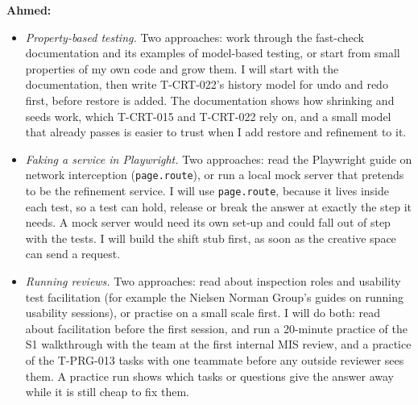 \documentclass[12pt, titlepage]{article}
\begin{document}
\begin{enumerate}
\textbf{Ahmed:}
\begin{itemize}
\item \emph{Property-based testing.} Two approaches: work through the
fast-check documentation and its examples of model-based testing, or start
from small properties of my own code and grow them. I will start with the
documentation, then write T-CRT-022's history model for undo and redo first,
before restore is added. The documentation shows how shrinking and seeds
work, which T-CRT-015 and T-CRT-022 rely on, and a small model that already
passes is easier to trust when I add restore and refinement to it.
\item \emph{Faking a service in Playwright.} Two approaches: read the
Playwright guide on network interception (\texttt{page.route}), or run a
local mock server that pretends to be the refinement service. I will use
\texttt{page.route}, because it lives inside each test, so a test can hold,
release or break the answer at exactly the step it needs. A mock server would
need its own set-up and could fall out of step with the tests. I will build
the shift stub first, as soon as the creative space can send a request.
\item \emph{Running reviews.} Two approaches: read about inspection roles and
usability test facilitation (for example the Nielsen Norman Group's guides on
running usability sessions), or practise on a small scale first. I will do
both: read about facilitation before the first session, and run a 20-minute
practice of the S1 walkthrough with the team at the first internal MIS review,
and a practice of the T-PRG-013 tasks with one teammate before any outside
reviewer sees them. A practice run shows which tasks or questions give the
answer away while it is still cheap to fix them.
\end{itemize}

\end{enumerate}
\end{document}
